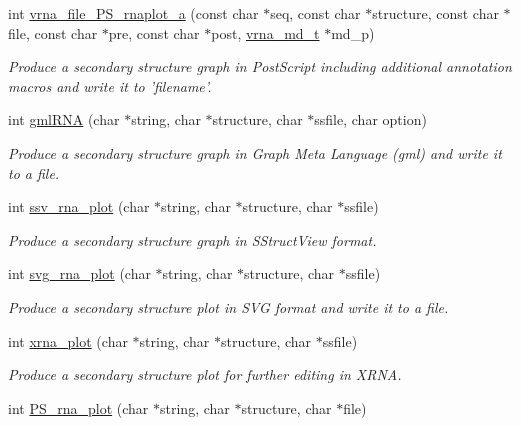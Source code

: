 \begin{DoxyCompactItemize}
int \hyperlink{group__plotting__utils_ga139a31dd0ba9fc6612431f67de901c31}{vrna\-\_\-file\-\_\-\-P\-S\-\_\-rnaplot\-\_\-a} (const char $\ast$seq, const char $\ast$structure, const char $\ast$file, const char $\ast$pre, const char $\ast$post, \hyperlink{group__model__details_ga1f8a10e12a0a1915f2a4eff0b28ea17c}{vrna\-\_\-md\-\_\-t} $\ast$md\-\_\-p)
\begin{DoxyCompactList}\small\item\em Produce a secondary structure graph in Post\-Script including additional annotation macros and write it to 'filename'. \end{DoxyCompactList}\item 
int \hyperlink{group__plotting__utils_ga70834bc8c0aad4fe6824ff76ccb8f329}{gml\-R\-N\-A} (char $\ast$string, char $\ast$structure, char $\ast$ssfile, char option)
\begin{DoxyCompactList}\small\item\em Produce a secondary structure graph in Graph Meta Language (gml) and write it to a file. \end{DoxyCompactList}\item 
int \hyperlink{group__plotting__utils_gadd368528755f9a830727b680243541df}{ssv\-\_\-rna\-\_\-plot} (char $\ast$string, char $\ast$structure, char $\ast$ssfile)
\begin{DoxyCompactList}\small\item\em Produce a secondary structure graph in S\-Struct\-View format. \end{DoxyCompactList}\item 
int \hyperlink{group__plotting__utils_gae7853539b5df98f294b4af434e979304}{svg\-\_\-rna\-\_\-plot} (char $\ast$string, char $\ast$structure, char $\ast$ssfile)
\begin{DoxyCompactList}\small\item\em Produce a secondary structure plot in S\-V\-G format and write it to a file. \end{DoxyCompactList}\item 
int \hyperlink{group__plotting__utils_ga2f6d5953e6a323df898896b8d6614483}{xrna\-\_\-plot} (char $\ast$string, char $\ast$structure, char $\ast$ssfile)
\begin{DoxyCompactList}\small\item\em Produce a secondary structure plot for further editing in X\-R\-N\-A. \end{DoxyCompactList}\item 
int \hyperlink{group__plotting__utils_ga0873c7cc4cd7a11c9a2cea19dde7e9c9}{P\-S\-\_\-rna\-\_\-plot} (char $\ast$string, char $\ast$structure, char $\ast$file)

\end{DoxyCompactItemize}
